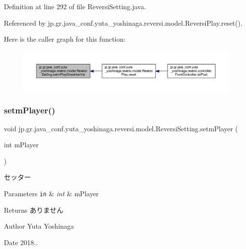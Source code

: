 Definition at line 292 of file Reversi\+Setting.\+java.



Referenced by jp.\+gr.\+java\+\_\+conf.\+yuta\+\_\+yoshinaga.\+reversi.\+model.\+Reversi\+Play.\+reset().

Here is the caller graph for this function\+:
\nopagebreak
\begin{figure}[H]
\begin{center}
\leavevmode
\includegraphics[width=350pt]{classjp_1_1gr_1_1java__conf_1_1yuta__yoshinaga_1_1reversi_1_1model_1_1_reversi_setting_aae2b022804d0828d000bdb09d247c82d_icgraph}
\end{center}
\end{figure}
\mbox{\label{classjp_1_1gr_1_1java__conf_1_1yuta__yoshinaga_1_1reversi_1_1model_1_1_reversi_setting_a092acf6b08576f10b48610ab6eddf0bd}} 
\subsubsection{\texorpdfstring{setm\+Player()}{setmPlayer()}}
{\footnotesize\ttfamily void jp.\+gr.\+java\+\_\+conf.\+yuta\+\_\+yoshinaga.\+reversi.\+model.\+Reversi\+Setting.\+setm\+Player (\begin{DoxyParamCaption}\item[{int}]{m\+Player }\end{DoxyParamCaption})}



セッター 


\begin{DoxyParams}[1]{Parameters}
\mbox{\tt in}  & {\em int} & m\+Player \\
\hline
\end{DoxyParams}
\begin{DoxyReturn}{Returns}
ありません 
\end{DoxyReturn}
\begin{DoxyAuthor}{Author}
Yuta Yoshinaga 
\end{DoxyAuthor}
\begin{DoxyDate}{Date}
2018.. 
\end{DoxyDate}


